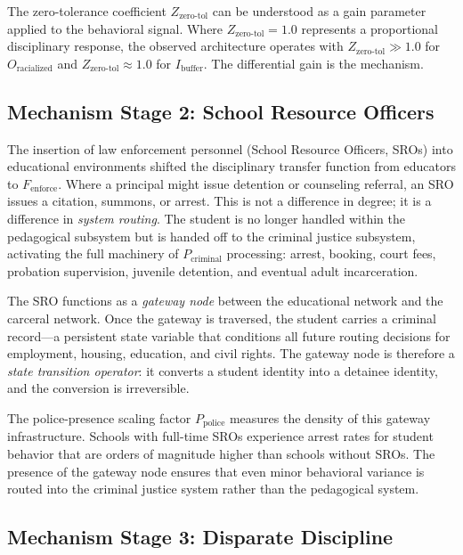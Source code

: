The zero-tolerance coefficient $Z_{\text{zero-tol}}$ can be understood as a gain parameter applied to the behavioral signal. Where $Z_{\text{zero-tol}} = 1.0$ represents a proportional disciplinary response, the observed architecture operates with $Z_{\text{zero-tol}} \gg 1.0$ for $O_{\text{racialized}}$ and $Z_{\text{zero-tol}} \approx 1.0$ for $I_{\text{buffer}}$. The differential gain is the mechanism.

\subsection{Mechanism Stage 2: School Resource Officers}

The insertion of law enforcement personnel (School Resource Officers, SROs) into educational environments shifted the disciplinary transfer function from educators to $F_{\text{enforce}}$. Where a principal might issue detention or counseling referral, an SRO issues a citation, summons, or arrest. This is not a difference in degree; it is a difference in \textit{system routing}. The student is no longer handled within the pedagogical subsystem but is handed off to the criminal justice subsystem, activating the full machinery of $P_{\text{criminal}}$ processing: arrest, booking, court fees, probation supervision, juvenile detention, and eventual adult incarceration.

The SRO functions as a \textit{gateway node} between the educational network and the carceral network. Once the gateway is traversed, the student carries a criminal record---a persistent state variable that conditions all future routing decisions for employment, housing, education, and civil rights. The gateway node is therefore a \textit{state transition operator}: it converts a student identity into a detainee identity, and the conversion is irreversible.

The police-presence scaling factor $P_{\text{police}}$ measures the density of this gateway infrastructure. Schools with full-time SROs experience arrest rates for student behavior that are orders of magnitude higher than schools without SROs. The presence of the gateway node ensures that even minor behavioral variance is routed into the criminal justice system rather than the pedagogical system.

\subsection{Mechanism Stage 3: Disparate Discipline}

